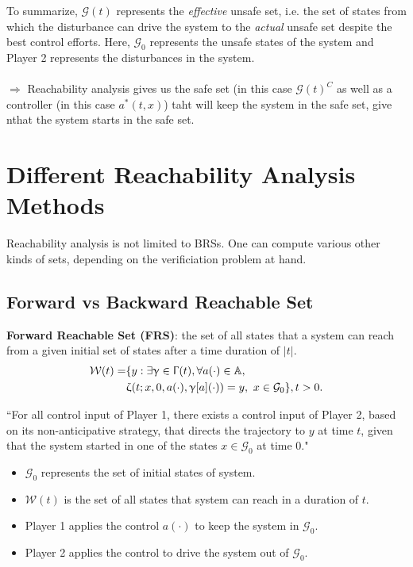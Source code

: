 \documentclass{article}
\begin{document}
\newpage

To summarize, $\mathcal{G}(t)$ represents the \textit{effective} unsafe set, i.e. the set of states from which the disturbance can drive the system to the \textit{actual} unsafe set despite the best control efforts. Here, $\mathcal{G}_0$ represents the unsafe states of the system and Player 2 represents the disturbances in the system.
\\
\\
$\Longrightarrow$ Reachability analysis gives us the safe set (in this case $\mathcal{G}(t)^C$ as well as a controller (in this case $a^*(t,x)$) taht will keep the system in the safe set, give nthat the system starts in the safe set.

\section{Different Reachability Analysis Methods}
Reachability analysis is not limited to BRSs. One can compute various other kinds of sets, depending on the verificiation problem at hand.

\subsection{Forward vs Backward Reachable Set}
\quad \textbf{Forward Reachable Set (FRS)}: the set of all states that a system can reach from a given initial set of states after a time duration of $|t|$.
\begin{equation}
    \begin{aligned}
    \mathcal{W}(t) = & \{ y : \exists \upgamma \in \Upgamma(t), \forall a(\cdot) \in \mathbb{A}, \\
    & \upzeta (t;x,0,a(\cdot),\upgamma[a](\cdot)) = y, \ x\in \mathcal{G}_0\}, t > 0.
    \end{aligned}
\end{equation}

``For all control input of Player 1, there exists a control input of Player 2, based on its non-anticipative strategy, that directs the trajectory to $y$ at time $t$, given that the system started in one of the states $x \in \mathcal{G}_0$ at time 0."

\begin{itemize}
    \item $\mathcal{G}_0$ represents the set of initial states of system.
    \item $\mathcal{W}(t)$ is the set of all states that system can reach in a duration of $t$.
    \item Player 1 applies the control $a(\cdot)$ to keep the system in $\mathcal{G}_0$.
    \item Player 2 applies the control to drive the system out of $\mathcal{G}_0$.
\end{itemize}
\end{document}
